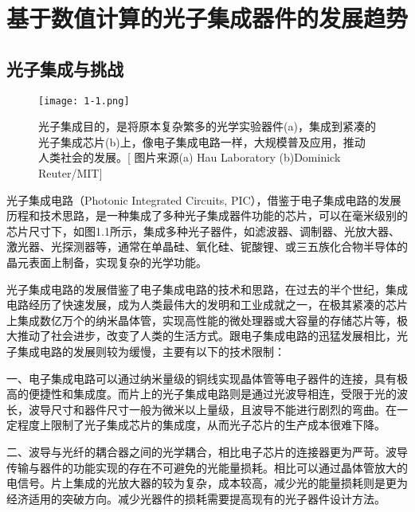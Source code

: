 \chapter{基于数值计算的光子集成器件的发展趋势}\label{chap:1}

\section{光子集成与挑战}


\begin{figure}[!htbp]
    \centering
    \texttt{[image: 1-1.png]}
    \caption{光子集成目的，是将原本复杂繁多的光学实验器件(a)，集成到紧凑的光子集成芯片(b)上，像电子集成电路一样，大规模普及应用，推动人类社会的发展。[{\color[HTML]{0000FF} 图片来源(a) Hau Laboratory (b)Dominick Reuter/MIT}]}
    \label{fig:1-1}
\end{figure}



光子集成电路（Photonic Integrated Circuits, PIC），借鉴于电子集成电路的发展历程和技术思路，是一种集成了多种光子集成器件功能的芯片，可以在毫米级别的芯片尺寸下，如图1.1所示，集成多种光子器件，如滤波器、调制器、光放大器、激光器、光探测器等，通常在单晶硅\cite{Coldren2012Diode,Reed2005Silicon,Soref2007The}、氧化硅\cite{Takato1988Silica,Alberto2008Silica}、铌酸锂\cite{Toney2015Lithium}、或三五族化合物半导体\cite{Binetti2012Indium}的晶元表面上制备，实现复杂的光学功能。

光子集成电路的发展借鉴了电子集成电路的技术和思路，在过去的半个世纪，集成电路经历了快速发展，成为人类最伟大的发明和工业成就之一\cite{Lockwood2004Silicon}，在极其紧凑的芯片上集成数亿万个的纳米晶体管，实现高性能的微处理器或大容量的存储芯片等，极大推动了社会进步，改变了人类的生活方式。跟电子集成电路的迅猛发展相比，光子集成电路的发展则较为缓慢，主要有以下的技术限制：

一、电子集成电路可以通过纳米量级的铜线实现晶体管等电子器件的连接，具有极高的便捷性和集成度。而片上的光子集成电路则是通过光波导相连，受限于光的波长，波导尺寸和器件尺寸一般为微米以上量级，且波导不能进行剧烈的弯曲。在一定程度上限制了光子集成芯片的集成度，从而光子芯片的生产成本很难下降。

二、波导与光纤的耦合器之间的光学耦合，相比电子芯片的连接器更为严苛。波导传输与器件的功能实现的存在不可避免的光能量损耗。相比可以通过晶体管放大的电信号\cite{Wissem2014Bridging,Miller2010Optical}。片上集成的光放大器的较为复杂，成本较高，减少光的能量损耗则是更为经济适用的突破方向。减少光器件的损耗需要提高现有的光子器件设计方法。

